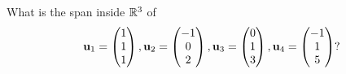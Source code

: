 \documentclass[10pt, a4paper]{article}
\begin{document}
\begin{example}
    What is the span inside $\mathbb{R} ^ 3$ of
    \[
    \mathbf{u}_1 = \begin{pmatrix}
        1 \\ 1 \\ 1
    \end{pmatrix},
    \mathbf{u}_2 = \begin{pmatrix}
        -1 \\ 0 \\ 2
    \end{pmatrix},
    \mathbf{u}_3 = \begin{pmatrix}
        0 \\ 1 \\ 3
    \end{pmatrix},
    \mathbf{u}_4 = \begin{pmatrix}
        -1 \\ 1 \\ 5
    \end{pmatrix}?
    \]


\end{example}
\end{document}
